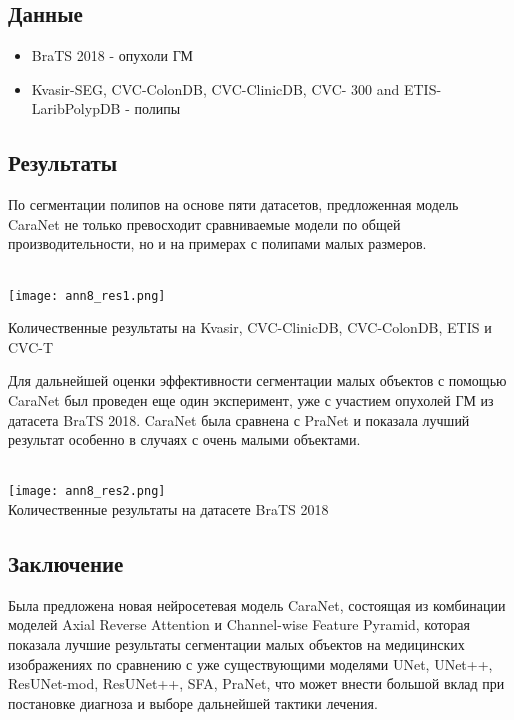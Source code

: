 \subsection*{Данные}
\begin{itemize}
    \item BraTS 2018 - опухоли ГМ
    \item Kvasir-SEG, CVC-ColonDB, CVC-ClinicDB, CVC-
    300 and ETIS-LaribPolypDB - полипы
\end{itemize}
 
\subsection*{Результаты}
По сегментации полипов на основе пяти датасетов, предложенная модель CaraNet не только 
превосходит сравниваемые модели по общей производительности, но и на примерах с полипами 
малых размеров. \\
\\
\begin{minipage}{1.0\linewidth}
    \begin{center}
        \texttt{[image: ann8\_res1.png]}
        \caption{\scriptsize{Количественные результаты на Kvasir, CVC-ClinicDB, CVC-ColonDB, ETIS и CVC-T}}
    \end{center}
\end{minipage}

Для дальнейшей оценки эффективности сегментации малых объектов с помощью CaraNet был 
проведен еще один эксперимент, уже с участием опухолей ГМ из датасета BraTS 2018. CaraNet 
была сравнена с PraNet и показала лучший результат особенно в случаях с очень малыми объектами. \\
\\
\begin{minipage}{1.0\linewidth}
    \begin{center}
        \texttt{[image: ann8\_res2.png]} \\
        \caption{\scriptsize{Количественные результаты на датасете BraTS 2018}}
    \end{center}
    
\end{minipage}



\subsection*{Заключение}
Была предложена новая нейросетевая модель CaraNet, состоящая из комбинации моделей 
Axial Reverse Attention и Channel-wise Feature Pyramid, которая показала 
лучшие результаты сегментации малых объектов на медицинских изображениях по сравнению с уже существующими моделями 
UNet, UNet++, ResUNet-mod, ResUNet++, SFA, PraNet, что может внести большой вклад 
при постановке диагноза и выборе дальнейшей тактики лечения.